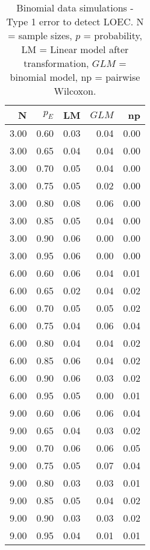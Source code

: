 \begin{table}[H]
\centering
\caption{Binomial data simulations - Type 1 error to detect LOEC. N = sample sizes, 
             $p$ = probability, LM = Linear model after transformation, 
             $GLM$ = binomial model, np = pairwise Wilcoxon.} 
\label{tab:t1_loec_p}
{\footnotesize
\begin{tabular}{rrrrr}
  \hline
N & $p_E$ & LM & $GLM$ & np \\ 
  \hline
3.00 & 0.60 & 0.03 & 0.04 & 0.00 \\ 
  3.00 & 0.65 & 0.04 & 0.04 & 0.00 \\ 
  3.00 & 0.70 & 0.05 & 0.04 & 0.00 \\ 
  3.00 & 0.75 & 0.05 & 0.02 & 0.00 \\ 
  3.00 & 0.80 & 0.08 & 0.06 & 0.00 \\ 
  3.00 & 0.85 & 0.05 & 0.04 & 0.00 \\ 
  3.00 & 0.90 & 0.06 & 0.00 & 0.00 \\ 
  3.00 & 0.95 & 0.06 & 0.00 & 0.00 \\ 
  6.00 & 0.60 & 0.06 & 0.04 & 0.01 \\ 
  6.00 & 0.65 & 0.02 & 0.04 & 0.02 \\ 
  6.00 & 0.70 & 0.05 & 0.05 & 0.02 \\ 
  6.00 & 0.75 & 0.04 & 0.06 & 0.04 \\ 
  6.00 & 0.80 & 0.04 & 0.04 & 0.02 \\ 
  6.00 & 0.85 & 0.06 & 0.04 & 0.02 \\ 
  6.00 & 0.90 & 0.06 & 0.03 & 0.02 \\ 
  6.00 & 0.95 & 0.05 & 0.00 & 0.01 \\ 
  9.00 & 0.60 & 0.06 & 0.06 & 0.04 \\ 
  9.00 & 0.65 & 0.04 & 0.03 & 0.02 \\ 
  9.00 & 0.70 & 0.06 & 0.06 & 0.05 \\ 
  9.00 & 0.75 & 0.05 & 0.07 & 0.04 \\ 
  9.00 & 0.80 & 0.03 & 0.03 & 0.01 \\ 
  9.00 & 0.85 & 0.05 & 0.04 & 0.02 \\ 
  9.00 & 0.90 & 0.03 & 0.03 & 0.02 \\ 
  9.00 & 0.95 & 0.04 & 0.01 & 0.01 \\ 
   \hline
\end{tabular}
}
\end{table}
